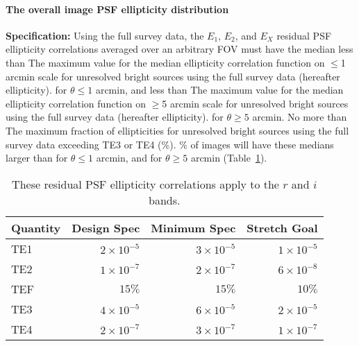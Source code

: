 

\paragraph{The overall image PSF ellipticity distribution\\}


{\bf Specification:} Using the full survey data, the $E_1$, $E_2$, and
$E_X$ residual PSF ellipticity correlations
averaged over an arbitrary FOV must have the median less than
{The maximum value for the median ellipticity correlation function
on $\le$1 arcmin scale for unresolved bright sources using the full survey data
(hereafter ellipticity).}
for $\theta \le 1$ arcmin, and less than
{The maximum value for the median ellipticity correlation function
on $\ge$5 arcmin scale for unresolved bright sources using the full survey data
(hereafter ellipticity).}
for $\theta \ge 5$ arcmin. No more than
{The maximum fraction of ellipticities for unresolved bright sources using the
full survey data exceeding TE3 or TE4 (\%).}
\% of images will have these medians larger than
for $\theta \le 1$ arcmin, and
for $\theta \ge 5$ arcmin (Table~\ref{fullEllip}).

\begin{table}[h]
\begin{tabular}{|l|r|r|r|}
\hline
Quantity       &   Design Spec & Minimum Spec  & Stretch Goal \\
\hline
      TE1 & $2 \times 10^{-5}$  & $3 \times 10^{-5}$ & $1 \times 10^{-5}$ \\
      TE2 & $1 \times 10^{-7}$  & $2 \times 10^{-7}$ & $6 \times 10^{-8}$ \\
      TEF & $15\%$              & $15\%$             & $10\%$             \\
      TE3 & $4 \times 10^{-5}$  & $6 \times 10^{-5}$ & $2 \times 10^{-5}$ \\
      TE4 & $2 \times 10^{-7}$  & $3 \times 10^{-7}$ & $1 \times 10^{-7}$ \\
\hline
\end{tabular}
\caption{These residual PSF ellipticity correlations apply to the $r$ and $i$ bands.}
\label{fullEllip}
\end{table}

